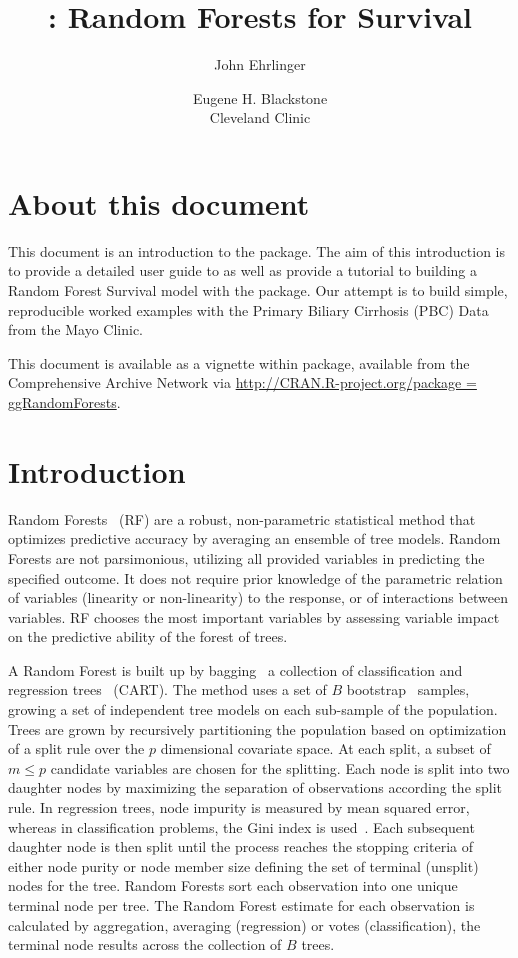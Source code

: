 \documentclass[nojss]{jss}\usepackage[]{graphicx}\usepackage[]{color}
\author{John Ehrlinger 
\and Eugene H. Blackstone\\Cleveland Clinic}
\title{\pkg{ggRandomForests}: Random Forests for Survival}
\begin{document}
\section{About this document}
This document is an introduction to the   package. The aim of this introduction is to provide a detailed user guide to  as well as provide a tutorial to building a Random Forest Survival model with the  package. Our attempt is to build simple, reproducible worked examples with the Primary Biliary Cirrhosis (PBC) Data from the Mayo Clinic.

This document is available as a vignette within  package, available from the Comprehensive  Archive Network via \url{http://CRAN.R-project.org/package = ggRandomForests}.

\section{Introduction} \label{S:introduction}

Random Forests~\citep{Breiman:2001} (RF) are a robust, non-parametric statistical method that optimizes predictive accuracy by averaging an ensemble of tree models. Random Forests are not parsimonious, utilizing all provided variables in predicting the specified outcome. It does not require prior knowledge of the parametric relation of variables (linearity or non-linearity) to the response, or of interactions between variables. RF chooses the most important variables by assessing variable impact on the predictive ability of the forest of trees.

A Random Forest is built up by bagging~\citep{Breiman:1996} a collection of classification and regression trees~\citep{cart:1984} (CART). The method uses a set of $B$ bootstrap~\citep{bootstrap:1994} samples, growing a set of independent tree models on each sub-sample of the population. Trees are grown by recursively partitioning the population based on optimization of a split rule over the $p$ dimensional covariate space. At each split, a subset of $m \le p$ candidate variables are chosen for the splitting. Each node is split into two daughter nodes by maximizing the separation of observations according the split rule. In regression trees, node impurity is measured by mean squared error, whereas in classification problems, the Gini index is used~\citep{FriedmanGreedyfunction:2000}. Each subsequent daughter node is then split until the process reaches the stopping criteria of either node purity or node member size defining the set of terminal (unsplit) nodes for the tree. Random Forests sort each observation into one unique terminal node per tree. The Random Forest estimate for each observation is calculated by aggregation, averaging (regression) or votes (classification), the terminal node results across the collection of $B$ trees. 
\end{document}
